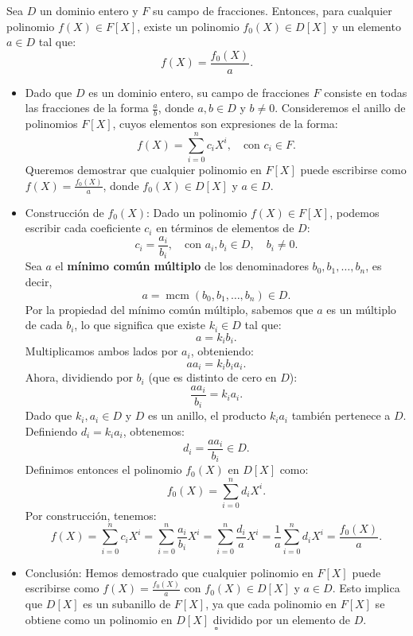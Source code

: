 Sea $D$ un dominio entero y $F$ su campo de fracciones. Entonces, para cualquier polinomio $f(X) \in F[X]$, existe un polinomio $f_0(X) \in D[X]$ y un elemento $a \in D$ tal que:
    \[
    f(X) = \frac{f_0(X)}{a}.
    \]
    \begin{itemize}

        \item Dado que $D$ es un dominio entero, su campo de fracciones $F$ consiste en todas las fracciones de la forma $\frac{a}{b}$, donde $a, b \in D$ y $b \neq 0$. Consideremos el anillo de polinomios $F[X]$, cuyos elementos son expresiones de la forma:
        \[
        f(X) = \sum_{i=0}^{n} c_i X^i, \quad \text{con } c_i \in F.
        \]
        Queremos demostrar que cualquier polinomio en $F[X]$ puede escribirse como $f(X) = \frac{f_0(X)}{a}$, donde $f_0(X) \in D[X]$ y $a \in D$.

        \item Construcción de $f_0(X)$: Dado un polinomio $f(X) \in F[X]$, podemos escribir cada coeficiente $c_i$ en términos de elementos de $D$:
        \[
        c_i = \frac{a_i}{b_i}, \quad \text{con } a_i, b_i \in D, \quad b_i \neq 0.
        \]
        Sea $a$ el \textbf{mínimo común múltiplo} de los denominadores $b_0, b_1, \dots, b_n$, es decir,
        \[
        a = \operatorname{mcm}(b_0, b_1, \dots, b_n) \in D.
        \]
        Por la propiedad del mínimo común múltiplo, sabemos que $a$ es un múltiplo de cada $b_i$, lo que significa que existe $k_i \in D$ tal que:
        \[
        a = k_i b_i.
        \]
        Multiplicamos ambos lados por $a_i$, obteniendo:
        \[
        a a_i = k_i b_i a_i.
        \]
        Ahora, dividiendo por $b_i$ (que es distinto de cero en $D$):
        \[
        \frac{a a_i}{b_i} = k_i a_i.
        \]
        Dado que $k_i, a_i \in D$ y $D$ es un anillo, el producto $k_i a_i$ también pertenece a $D$. Definiendo $d_i = k_i a_i$, obtenemos:
        \[
        d_i = \frac{a a_i}{b_i} \in D.
        \]
        Definimos entonces el polinomio $f_0(X)$ en $D[X]$ como:
        \[
        f_0(X) = \sum_{i=0}^{n} d_i X^i.
        \]
        Por construcción, tenemos:
        \[
        f(X) = \sum_{i=0}^{n} c_i X^i = \sum_{i=0}^{n} \frac{a_i}{b_i} X^i = \sum_{i=0}^{n} \frac{d_i}{a} X^i = \frac{1}{a} \sum_{i=0}^{n} d_i X^i = \frac{f_0(X)}{a}.
        \]

        \item Conclusión: Hemos demostrado que cualquier polinomio en $F[X]$ puede escribirse como $f(X) = \frac{f_0(X)}{a}$ con $f_0(X) \in D[X]$ y $a \in D$. Esto implica que $D[X]$ es un subanillo de $F[X]$, ya que cada polinomio en $F[X]$ se obtiene como un polinomio en $D[X]$ dividido por un elemento de $D$.
        \[
        \square
        \]
    \end{itemize}
